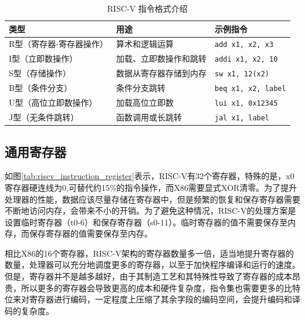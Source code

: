 \begin{table}[htbp]
	\centering
	\caption{RISC-V 指令格式介绍}
	\begin{tabularx}{\textwidth}{>{\centering\arraybackslash}X >{\centering\arraybackslash}X >{\centering\arraybackslash}X}
		\toprule
		\textbf{类型}   & \textbf{用途} & \textbf{示例指令}              \\
		\midrule
		R型（寄存器-寄存器操作） & 算术和逻辑运算     & \texttt{add x1, x2, x3}    \\
		I型（立即数操作）     & 加载、立即数操作和跳转 & \texttt{addi x1, x2, 10}   \\
		S型（存储操作）      & 数据从寄存器存储到内存 & \texttt{sw x1, 12(x2)}     \\
		B型（条件分支）      & 条件分支跳转      & \texttt{beq x1, x2, label} \\
		U型（高位立即数操作）   & 加载高位立即数     & \texttt{lui x1, 0x12345}   \\
		J型（无条件跳转）     & 函数调用或长跳转    & \texttt{jal x1, label}     \\
		\bottomrule
	\end{tabularx}
	\label{tab:riscv_instruction_formats}
\end{table}

\subsection{通用寄存器}

如图\ref{tab:riscv_instruction_register}表示，RISC-V有32个寄存器，特殊的是，x0寄存器硬连线为0,可替代约15\%的指令操作，而X86需要显式XOR清零。为了提升处理器的性能，数据应该尽量存储在寄存器中，但是频繁的恢复和保存寄存器需要不断地访问内存，会带来不小的开销。为了避免这种情况，RISC-V的处理方案是设置临时寄存器（t0-6）和保存寄存器（s0-11）。临时寄存器的值不需要保存至内存，而保存寄存器的值需要保存至内存。

相比X86的16个寄存器，RISC-V架构的寄存器数量多一倍，适当地提升寄存器的数量，处理器可以充分地调度更多的寄存器，以至于加快程序编译和运行的速度。但是，寄存器并不是越多越好，由于其制造工艺和其特殊性导致了寄存器的成本昂贵，所以更多的寄存器会导致更高的成本和硬件复杂度，指令集也需要更多的比特位来对寄存器进行编码，一定程度上压缩了其余字段的编码空间，会提升编码和译码的复杂度。

